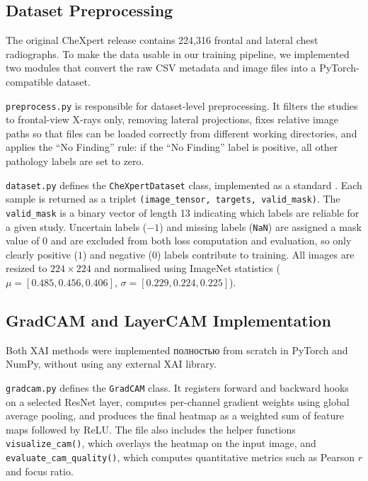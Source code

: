 \documentclass[12pt]{article}
\begin{document}
\subsection{Dataset Preprocessing}

The original CheXpert release contains 224,316 frontal and lateral chest radiographs. To make the data usable in our training pipeline, we implemented two modules that convert the raw CSV metadata and image files into a PyTorch-compatible dataset.

\texttt{preprocess.py} is responsible for dataset-level preprocessing. It filters the studies to frontal-view X-rays only, removing lateral projections, fixes relative image paths so that files can be loaded correctly from different working directories, and applies the ``No Finding'' rule: if the ``No Finding'' label is positive, all other pathology labels are set to zero.

\texttt{dataset.py} defines the \texttt{CheXpertDataset} class, implemented as a standard . Each sample is returned as a triplet \texttt{(image\_tensor, targets, valid\_mask)}. The \texttt{valid\_mask} is a binary vector of length 13 indicating which labels are reliable for a given study. Uncertain labels ($-1$) and missing labels (\texttt{NaN}) are assigned a mask value of 0 and are excluded from both loss computation and evaluation, so only clearly positive ($1$) and negative ($0$) labels contribute to training. All images are resized to $224\times224$ and normalised using ImageNet statistics ($\mu = [0.485, 0.456, 0.406]$, $\sigma = [0.229, 0.224, 0.225]$).

\subsection{GradCAM and LayerCAM Implementation}

Both XAI methods were implemented полностью from scratch in PyTorch and NumPy, without using any external XAI library.

\texttt{gradcam.py} defines the \texttt{GradCAM} class. It registers forward and backward hooks on a selected ResNet layer, computes per-channel gradient weights using global average pooling, and produces the final heatmap as a weighted sum of feature maps followed by ReLU. The file also includes the helper functions \texttt{visualize\_cam()}, which overlays the heatmap on the input image, and \texttt{evaluate\_cam\_quality()}, which computes quantitative metrics such as Pearson $r$ and focus ratio.
\end{document}
